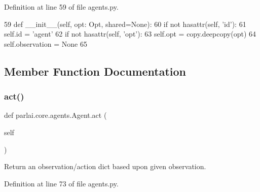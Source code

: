 Definition at line 59 of file agents.\+py.


\begin{DoxyCode}
59     \textcolor{keyword}{def }\_\_init\_\_(self, opt: Opt, shared=\textcolor{keywordtype}{None}):
60         \textcolor{keywordflow}{if} \textcolor{keywordflow}{not} hasattr(self, \textcolor{stringliteral}{'id'}):
61             self.id = \textcolor{stringliteral}{'agent'}
62         \textcolor{keywordflow}{if} \textcolor{keywordflow}{not} hasattr(self, \textcolor{stringliteral}{'opt'}):
63             self.opt = copy.deepcopy(opt)
64         self.observation = \textcolor{keywordtype}{None}
65 
\end{DoxyCode}


\subsection{Member Function Documentation}
\mbox{\label{classparlai_1_1core_1_1agents_1_1Agent_a6a8abe0a98dd59bc39c9f12b163072db}} 
\subsubsection{\texorpdfstring{act()}{act()}}
{\footnotesize\ttfamily def parlai.\+core.\+agents.\+Agent.\+act (\begin{DoxyParamCaption}\item[{}]{self }\end{DoxyParamCaption})}

\begin{DoxyVerb}Return an observation/action dict based upon given observation.
\end{DoxyVerb}
 

Definition at line 73 of file agents.\+py.


